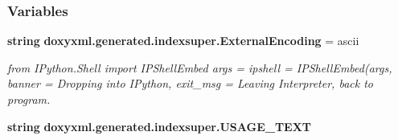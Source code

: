 \subsubsection*{Variables}
\begin{DoxyCompactItemize}
\item 
{\bf string} {\bf doxyxml.\+generated.\+indexsuper.\+External\+Encoding} = \textquotesingle{}ascii\textquotesingle{}
\begin{DoxyCompactList}\small\item\em from I\+Python.\+Shell import I\+P\+Shell\+Embed args = \textquotesingle{}\textquotesingle{} ipshell = I\+P\+Shell\+Embed(args, banner = \textquotesingle{}Dropping into I\+Python\textquotesingle{}, exit\+\_\+msg = \textquotesingle{}Leaving Interpreter, back to program. \end{DoxyCompactList}\item 
{\bf string} {\bf doxyxml.\+generated.\+indexsuper.\+U\+S\+A\+G\+E\+\_\+\+T\+E\+XT}
\end{DoxyCompactItemize}

